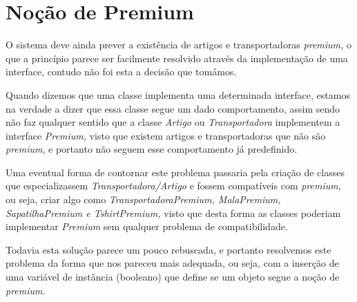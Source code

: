     \section{Noção de Premium}

    O sistema deve ainda prever a existência de artigos e transportadoras \textit{premium,} o que a princípio parece ser facilmente resolvido através da implementação de uma interface, contudo não foi esta a decisão que tomámos.

    Quando dizemos que uma classe implementa uma determinada interface, estamos na verdade a dizer que essa classe segue um dado comportamento, assim sendo não faz qualquer sentido que a classe \textit{Artigo} ou \textit{Transportadora} implementem a interface \textit{Premium,} visto que existem artigos e transportadoras que não são \textit{premium}, e portanto não seguem esse comportamento já predefinido.

    Uma eventual forma de contornar este problema passaria pela criação de classes que especializassem \textit{Transportadora/Artigo} e fossem compatíveis com \textit{premium}, ou seja, criar algo como \textit{TransportadoraPremium, MalaPremium, SapatilhaPremium e TshirtPremium,} visto que desta forma as classes poderiam implementar \textit{Premium} sem qualquer problema de compatibilidade.

    Todavia esta solução parece um pouco rebuscada, e portanto resolvemos este problema da forma que nos pareceu mais adequada, ou seja, com a inserção de uma variável de instância (booleano) que define se um objeto segue a noção de \textit{premium.}